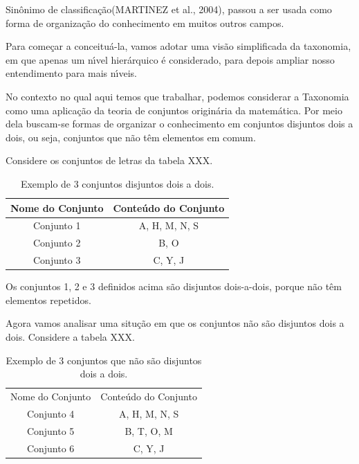 \documentclass[
12pt,		%
openright,	%
twoside,  %
a4paper,			%
chapter=TITLE,		%
english,			%
french,				%
spanish,			%
brazil				%
]{USPSC-classe/USPSC}
\begin{document}
Sin\^onimo de \textquotedbl classifica\c{c}\~ao\textquotedbl   (MARTINEZ et al., 2004), passou a ser usada como forma de organiza\c{c}\~ao do conhecimento em muitos outros campos.




Para come\c{c}ar a conceitu\'a-la, vamos adotar uma vis\~ao simplificada da taxonomia, em que apenas um n\'{\i}vel hier\'arquico \'e considerado, para depois ampliar nosso entendimento para mais n\'{\i}veis.




No contexto no qual aqui temos que trabalhar, podemos considerar a Taxonomia como uma aplica\c{c}\~ao da teoria de conjuntos origin\'aria da matem\'atica. Por meio dela buscam-se formas de organizar o conhecimento em \textquotedbl conjuntos disjuntos dois a dois\textquotedbl , ou seja, conjuntos que n\~ao t\^em elementos em comum.




Considere os conjuntos de letras da tabela XXX.








\begin{table}[htb]
\tiny
\caption{\label{44490fe2b906078abd65fafd043ad29728406f42}Exemplo de 3 conjuntos disjuntos dois a dois.}

\centering
\begin{tabular}{|c|c|}
\hline
Nome do Conjunto  &  Conte\'udo do Conjunto \\
\hline
Conjunto 1  &  A, H, M, N, S \\
Conjunto 2  &  B, O \\
Conjunto 3  &  C, Y, J \\
\hline
\end{tabular}
\end{table}


Os conjuntos 1, 2 e 3 definidos acima s\~ao \textquotedbl disjuntos dois-a-dois\textquotedbl , porque n\~ao t\^em elementos repetidos.




Agora vamos analisar uma situ\c{c}\~ao em que os conjuntos n\~ao s\~ao disjuntos dois a dois. Considere a tabela XXX.








\begin{table}[htb]
\tiny
\caption{\label{9ff362cd60f20203c10ee684d58cf4dec084efbb}Exemplo de 3 conjuntos que n\~ao s\~ao disjuntos dois a dois.}

\centering
\begin{tabular}{|c|c|}
\hline
Nome do Conjunto  &  Conte\'udo do Conjunto \\
Conjunto 4  &  A, H, M, N, S \\
Conjunto 5  &  B, T, O, M \\
Conjunto 6  &  C, Y, J \\
\hline
\end{tabular}
\end{table}
\end{document}
